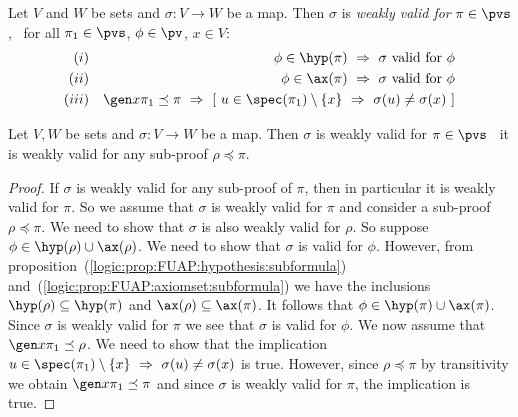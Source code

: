 \begin{defin}\label{logic:def:FUAP:validsub:validsub}
Let $V$ and $W$ be sets and $\sigma:V\to W$ be a map. Then $\sigma$
is {\em weakly valid for} $\pi\in\pvs$, \ifand\ for all
$\pi_{1}\in\pvs$, $\phi\in\pv$, $x\in V$:
    \begin{eqnarray*}
    (i)&&\phi\in\hyp(\pi)\ \Rightarrow\ \mbox{$\sigma$ valid for $\phi$}\\
    (ii)&&\phi\in\ax(\pi)\ \Rightarrow\ \mbox{$\sigma$ valid for $\phi$}\\
    (iii)&&\gen x\pi_{1}\preceq\pi\ \Rightarrow\ [\
    u\in\spec(\pi_{1})\setminus\{x\}\ \Rightarrow\
    \sigma(u)\neq\sigma(x)\ ]
    \end{eqnarray*}
\end{defin}

\begin{prop}\label{logic:prop:FUAP:validsub:subformula}
Let $V, W$ be sets and $\sigma:V\to W$ be a map. Then $\sigma$ is
weakly valid for $\pi\in\pvs$ \ifand\ it is weakly valid for any
sub-proof $\rho\preceq\pi$.
\end{prop}
\begin{proof}
If $\sigma$ is weakly valid for any sub-proof of $\pi$, then in
particular it is weakly valid for $\pi$. So we assume that $\sigma$
is weakly valid for $\pi$ and consider a sub-proof $\rho\preceq\pi$.
We need to show that $\sigma$ is also weakly valid for $\rho$. So
suppose $\phi\in\hyp(\rho)\cup\ax(\rho)$. We need to show that
$\sigma$ is valid for $\phi$. However, from
proposition~(\ref{logic:prop:FUAP:hypothesis:subformula})
and~(\ref{logic:prop:FUAP:axiomset:subformula}) we have the
inclusions $\hyp(\rho)\subseteq\hyp(\pi)$  and
$\ax(\rho)\subseteq\ax(\pi)$. It follows that
$\phi\in\hyp(\pi)\cup\ax(\pi)$. Since $\sigma$ is weakly valid for
$\pi$ we see that $\sigma$ is valid for $\phi$. We now assume that
$\gen x\pi_{1}\preceq\rho$. We need to show that the implication
$u\in\spec(\pi_{1})\setminus\{x\}\ \Rightarrow\
    \sigma(u)\neq\sigma(x)$ is true. However, since $\rho\preceq\pi$ by transitivity we obtain
$\gen x\pi_{1}\preceq\pi$ and since $\sigma$ is weakly valid for
$\pi$, the implication is true.
\end{proof}

